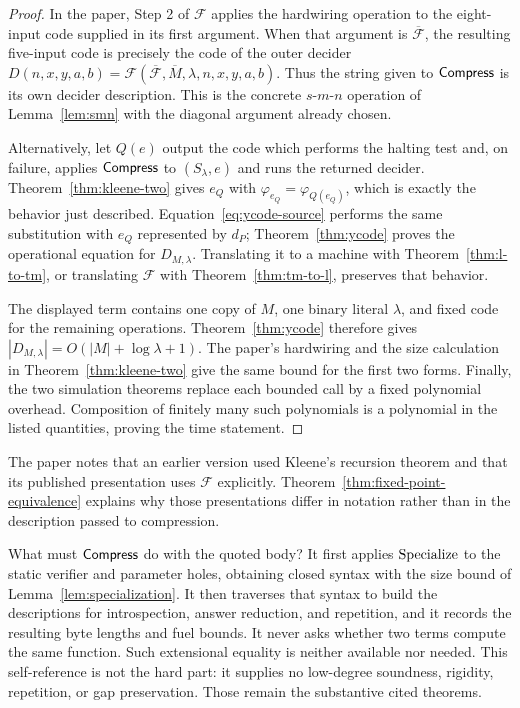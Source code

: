 \begin{proof}
In the paper, Step 2 of \(\mathcal F\) applies the hardwiring operation to the
eight-input code supplied in its first argument.  When that argument is
\(\overline{\mathcal F}\), the resulting five-input code is precisely the code
of the outer decider
\(D(n,x,y,a,b)=\mathcal F(\overline{\mathcal F},\overline M,\lambda,n,x,y,a,b)\).
Thus the string given to \(\mathsf{Compress}\) is its own decider description.  This
is the concrete \(s\)-\(m\)-\(n\) operation of Lemma~\ref{lem:smn} with the
diagonal argument already chosen.

Alternatively, let \(Q(e)\) output the code which performs the halting test and,
on failure, applies \(\mathsf{Compress}\) to \((S_\lambda,e)\) and runs the returned decider.
Theorem~\ref{thm:kleene-two} gives \(e_Q\) with
\(\varphi_{e_Q}=\varphi_{Q(e_Q)}\), which is exactly the behavior just
described.  Equation~\eqref{eq:ycode-source} performs the same substitution
with \(e_Q\) represented by \(d_P\); Theorem~\ref{thm:ycode} proves the
operational equation for \(D_{M,\lambda}\).  Translating it to a machine with
Theorem~\ref{thm:l-to-tm}, or translating \(\mathcal F\) with
Theorem~\ref{thm:tm-to-l}, preserves that behavior.

The displayed term contains one copy of \(M\), one binary literal \(\lambda\), and
fixed code for the remaining operations.  Theorem~\ref{thm:ycode} therefore
gives \(|D_{M,\lambda}|=O(|M|+\log\lambda+1)\).  The paper's hardwiring and the size
calculation in Theorem~\ref{thm:kleene-two} give the same bound for the first
two forms.  Finally, the two simulation theorems replace each bounded call by a
fixed polynomial overhead.  Composition of finitely many such polynomials is
a polynomial in the listed quantities, proving the time statement.
\end{proof}

The paper notes that an earlier version used Kleene's recursion theorem and
that its published presentation uses \(\mathcal F\) explicitly.
  Theorem~\ref{thm:fixed-point-equivalence}
explains why those presentations differ in notation rather than in the
description passed to compression.

What must \(\mathsf{Compress}\) do with the quoted body?  It first applies
\(\operatorname{Specialize}\) to the static verifier and parameter holes, obtaining closed
syntax with the size bound of Lemma~\ref{lem:specialization}.  It then traverses
that syntax to build the descriptions for introspection, answer reduction, and
repetition, and it records the resulting byte lengths and fuel bounds.  It
never asks whether two terms compute the same function.  Such extensional
equality is neither available nor needed.  This self-reference is not the hard
part: it supplies no low-degree soundness, rigidity, repetition, or gap
preservation.  Those remain the substantive cited theorems.

